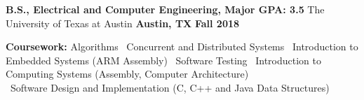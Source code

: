 \begin{cventries}
  \cventry
    {\textbf{\normalsize B.S., Electrical and Computer Engineering, Major GPA: \large 3.5}}
    {\large The University of Texas at Austin}
    {\normalsize \textbf{Austin, TX}}
    {\normalsize \textbf{Fall 2018}}
    {
      \begin{cvitems}
        \item {\normalsize \textbf{Coursework:} Algorithms {\LARGE\textbullet }\ Concurrent and Distributed Systems {\LARGE\textbullet }\ Introduction to Embedded Systems (ARM Assembly) {\LARGE\textbullet }\ Software Testing {\LARGE\textbullet }\ Introduction to Computing Systems (Assembly, Computer Architecture) \\{\LARGE\textbullet }\ Software Design and Implementation (C, C++ and Java Data Structures)}
      \end{cvitems}
    }
\end{cventries}
